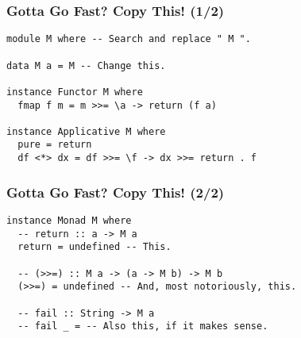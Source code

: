\begin{frame}[fragile]

\frametitle{Gotta Go Fast? Copy This! (1/2)}

\begin{lstlisting}[escapeinside=@@]
module M where -- Search and replace " M ".

data M a = M -- Change this.

instance Functor M where
  fmap f m = m >>= \a -> return (f a)

instance Applicative M where
  pure = return
  df <*> dx = df >>= \f -> dx >>= return . f
\end{lstlisting}

\end{frame}


\begin{frame}[fragile]

\frametitle{Gotta Go Fast? Copy This! (2/2)}

\begin{lstlisting}[escapeinside=@@]
instance Monad M where
  -- return :: a -> M a
  return = undefined -- This.

  -- (>>=) :: M a -> (a -> M b) -> M b
  (>>=) = undefined -- And, most notoriously, this.

  -- fail :: String -> M a
  -- fail _ = -- Also this, if it makes sense.
\end{lstlisting}

\end{frame}
